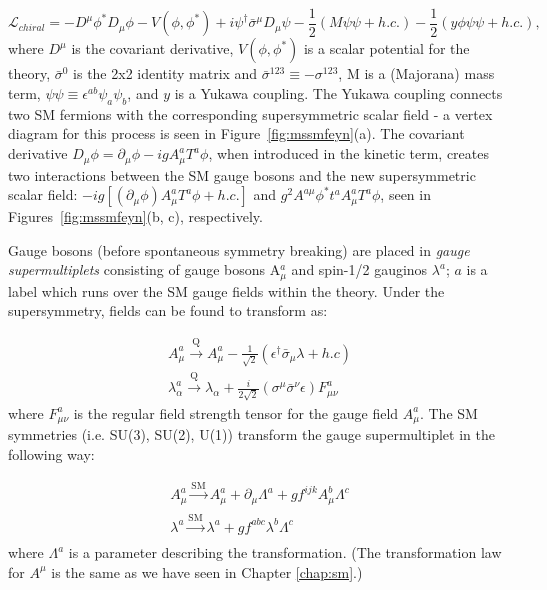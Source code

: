 \begin{equation}
\label{eq:lchiral}
\mathcal{L}_{chiral} = - D^{\mu}\phi^{*}D_{\mu}\phi - V(\phi, \phi^{*}) + i \psi^{\dagger}\bar{\sigma}^{\mu} D_{\mu}\psi - \frac{1}{2} (M \psi \psi + h.c.) - \frac{1}{2} (y \phi  \psi \psi + h.c.),
\end{equation}
where $D^{\mu}$ is the covariant derivative, $V(\phi, \phi^{*})$ is a scalar potential for the theory, $\bar{\sigma}^{0}$ is the 2x2 identity matrix and $\bar{\sigma}^{123}\equiv-\sigma^{123}$, M is a (Majorana) mass term, $\psi\psi\equiv\epsilon^{ab}\psi_{a}\psi_{b}$, and $y$ is a Yukawa coupling. The Yukawa coupling connects two SM fermions with the corresponding supersymmetric scalar field - a vertex diagram for this process is seen in Figure~\ref{fig:mssmfeyn}(a). The covariant derivative $D_{\mu} \phi = \partial_{\mu}\phi -igA^{a}_{\mu}T^{a}\phi$, when introduced in the kinetic term, creates two interactions between the SM gauge bosons and the new supersymmetric scalar field: $-ig[(\partial_{\mu}\phi)A^{a}_{\mu}T^{a}\phi+h.c.]$ and $g^{2}A^{a\mu}\phi^{*}t^{a}A^{a}_{\mu}T^{a}\phi$, seen in Figures~\ref{fig:mssmfeyn}(b, c), respectively.

Gauge bosons (before spontaneous symmetry breaking) are placed in \textit{gauge supermultiplets} consisting of gauge bosons A$_{\mu}^{a}$ and spin-1/2 gauginos $\lambda^{a}$; $a$ is a label which runs over the SM gauge fields within the theory. Under the supersymmetry, fields can be found to transform as:

\begin{equation}
\begin{array}{l}
A_{\mu}^{a} \xrightarrow[]{\text{Q}} A_{\mu}^{a} - \frac{1}{\sqrt{2}} ( \epsilon^{\dagger} \bar{\sigma}_{\mu} \lambda + h.c)\\
\lambda_{\alpha}^{a} \xrightarrow[]{\text{Q}} \lambda_{\alpha} + \frac{i}{2\sqrt{2}}(\sigma^{\mu}\bar{\sigma}^{\nu}\epsilon)F_{\mu\nu}^{a}
\end{array}
\end{equation}
where $F_{\mu\nu}^{a}$ is the regular field strength tensor for the gauge field $A_{\mu}^{a}$. The SM symmetries (i.e. SU(3), SU(2), U(1)) transform the gauge supermultiplet in the following way:

\begin{equation}
\begin{array}{l}
A_{\mu}^{a} \xrightarrow[]{\text{SM}}  A_{\mu}^{a} + \partial_{\mu}\Lambda^{a} + gf^{ijk}A_{\mu}^{b}\Lambda^{c}\\
\lambda^{a} \xrightarrow[]{\text{SM}}  \lambda^{a} + gf^{abc}\lambda^{b}\Lambda^{c}
\end{array}
\end{equation}
where $\Lambda^{a}$ is a parameter describing the transformation. (The transformation law for $A^{\mu}$ is the same as we have seen in Chapter \ref{chap:sm}.)

